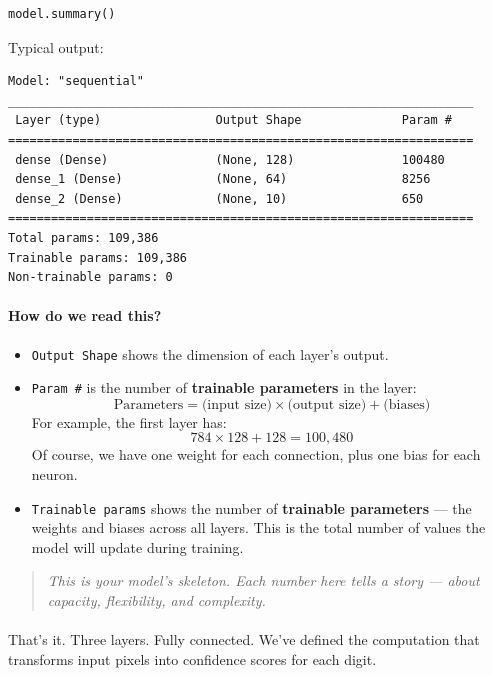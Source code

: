 \documentclass[11pt]{article}
\begin{document}
\begin{verbatim}
model.summary()
\end{verbatim}

Typical output:
\begin{verbatim}
Model: "sequential"
_________________________________________________________________
 Layer (type)                Output Shape              Param #
=================================================================
 dense (Dense)               (None, 128)               100480
 dense_1 (Dense)             (None, 64)                8256
 dense_2 (Dense)             (None, 10)                650
=================================================================
Total params: 109,386
Trainable params: 109,386
Non-trainable params: 0
\end{verbatim}

\paragraph{How do we read this?}

\begin{itemize}
    \item \texttt{Output Shape} shows the dimension of each layer’s output.
    \item \texttt{Param \#} is the number of \textbf{trainable parameters} in the layer:
    \[
    \text{Parameters} = \text{(input size)} \times \text{(output size)} + \text{(biases)}
    \]
    For example, the first layer has:
    \[
    784 \times 128 + 128 = 100{,}480
    \]
    Of course, we have one weight for each connection, plus one bias for each neuron.
    \item \texttt{Trainable params} shows the number of \textbf{trainable parameters} — the weights and biases across all layers. This is the total number of values the model will update during training.
\end{itemize}

\begin{quote}
\textit{This is your model’s skeleton. Each number here tells a story — about capacity, flexibility, and complexity.}
\end{quote}

\paragraph{} That’s it. Three layers. Fully connected.  
We’ve defined the computation that transforms input pixels into confidence scores for each digit.
\end{document}
